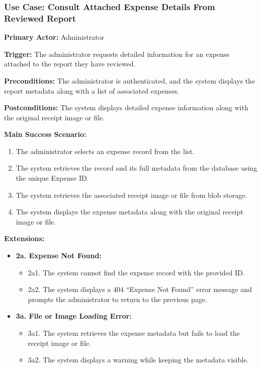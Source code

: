 \subsubsection{\textbf{Use Case: Consult Attached Expense Details From Reviewed Report}}

\textbf{Primary Actor:} Administrator

\textbf{Trigger:} The administrator requests detailed information for an expense attached to the report they have reviewed.

\textbf{Preconditions:} The administrator is authenticated, and the system displays the report metadata along with a list of associated expenses.

\textbf{Postconditions:} The system displays detailed expense information along with the original receipt image or file.

\vspace{0.5cm}

\textbf{Main Success Scenario:}

\begin{enumerate} [leftmargin=0.75cm, noitemsep]
\item The administrator selects an expense record from the list.
\item The system retrieves the record and its full metadata from the database using the unique Expense ID.
\item The system retrieves the associated receipt image or file from blob storage.
\item The system displays the expense metadata along with the original receipt image or file.
\end{enumerate}

\vspace{0.3cm}

\textbf{Extensions:}

\begin{itemize} [label={}, leftmargin=0.75cm, noitemsep]

    \item \textbf{2a. Expense Not Found:}
    \begin{itemize} [label={}, leftmargin=0.75cm, noitemsep]
        \item 2a1. The system cannot find the expense record with the provided ID.
        \item 2a2. The system displays a 404 ``Expense Not Found'' error message and prompts the administrator to return to the previous page.
    \end{itemize}

    \item \textbf{3a. File or Image Loading Error:}
    \begin{itemize} [label={}, leftmargin=0.75cm, noitemsep]
        \item 3a1. The system retrieves the expense metadata but fails to load the receipt image or file.
        \item 3a2. The system displays a warning while keeping the metadata visible.
    \end{itemize}

\end{itemize}

\vspace{0.3cm}
